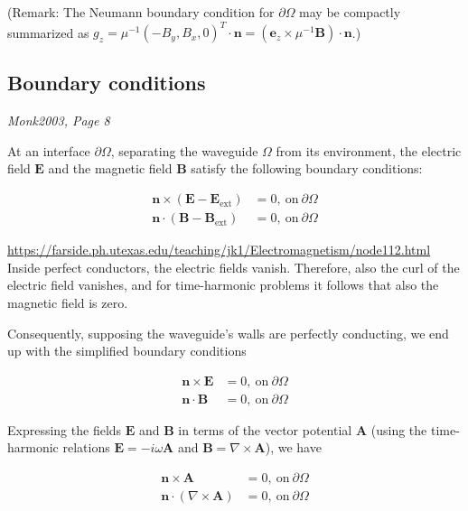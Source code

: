 \documentclass[11pt, a4paper]{article}
\begin{document}
(Remark: The Neumann boundary condition for $\partial \Omega$ may
be compactly summarized as $g_z = \mu^{-1} (-B_y, B_x, 0)^T \cdot \mathbf{n} = (\mathbf{e}_z \times \mu^{-1} \mathbf{B}) \cdot \mathbf{n }$.)

\subsection{Boundary conditions}
\label{subsec:boundary}

\textit{Monk2003, Page 8}

At an interface $\partial \Omega$, separating the waveguide $\Omega$ from its
environment, the electric field $\mathbf{E}$
and the magnetic field $\mathbf{B}$ satisfy the following boundary
conditions:

\begin{align}
    \mathbf{n} \times (\mathbf{E} - \mathbf{E}_{\text{ext}}) &= 0, ~\text{on}~ \partial \Omega \\
    \mathbf{n} \cdot (\mathbf{B} - \mathbf{B}_{\text{ext}}) &= 0, ~\text{on}~ \partial \Omega
\end{align}

\url{https://farside.ph.utexas.edu/teaching/jk1/Electromagnetism/node112.html}
Inside perfect conductors, the electric fields vanish. Therefore, also the curl 
of the electric field vanishes, and for time-harmonic problems it follows that 
also the magnetic field is zero.

Consequently, supposing the waveguide's walls are perfectly conducting, we end 
up with the simplified boundary conditions

\begin{align}
     \mathbf{n} \times \mathbf{E} &= 0, ~\text{on}~ \partial \Omega \\
     \mathbf{n} \cdot \mathbf{B} &= 0, ~\text{on}~ \partial \Omega
\end{align}

Expressing the fields $\mathbf{E}$ and $\mathbf{B}$ in terms of the vector 
potential $\mathbf{A}$ (using the time-harmonic relations $\mathbf{E} = - i \omega \mathbf{A}$
and $\mathbf{B} = \nabla \times \mathbf{A}$), we have 

\begin{align}
    \mathbf{n} \times \mathbf{A} &= 0, ~\text{on}~ \partial \Omega \\
    \mathbf{n} \cdot (\nabla \times \mathbf{A}) &= 0, ~\text{on}~ \partial \Omega
\end{align}
\end{document}
